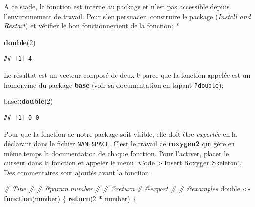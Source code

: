 \documentclass[
  12pt,
  french,
  a4paper,
  extrafontsizes,onecolumn,openright
  ]{memoir}
\newenvironment{Shaded}{\begin{snugshade}}{\end{snugshade}}
\newcommand{\CommentTok}[1]{\textcolor[rgb]{0.56,0.35,0.01}{\textit{#1}}}
\newcommand{\ControlFlowTok}[1]{\textcolor[rgb]{0.13,0.29,0.53}{\textbf{#1}}}
\newcommand{\DecValTok}[1]{\textcolor[rgb]{0.00,0.00,0.81}{#1}}
\newcommand{\FunctionTok}[1]{\textcolor[rgb]{0.13,0.29,0.53}{\textbf{#1}}}
\newcommand{\NormalTok}[1]{#1}
\newcommand{\OtherTok}[1]{\textcolor[rgb]{0.56,0.35,0.01}{#1}}
\newcommand{\SpecialCharTok}[1]{\textcolor[rgb]{0.81,0.36,0.00}{\textbf{#1}}}
\begin{document}
\normalsize

A ce stade, la fonction est interne au package et n'est pas accessible depuis l'environnement de travail.
Pour s'en persuader, construire le package (\emph{Install and Restart}) et vérifier le bon fonctionnement de la fonction:
*

\scriptsize

\begin{Shaded}
\begin{Highlighting}[]
\FunctionTok{double}\NormalTok{(}\DecValTok{2}\NormalTok{)}
\end{Highlighting}
\end{Shaded}

\begin{verbatim}
## [1] 4
\end{verbatim}

\normalsize

Le résultat est un vecteur composé de deux 0 parce que la fonction appelée est un homonyme du package \textbf{base} (voir sa documentation en tapant \texttt{?double}):

\scriptsize

\begin{Shaded}
\begin{Highlighting}[]
\NormalTok{base}\SpecialCharTok{::}\FunctionTok{double}\NormalTok{(}\DecValTok{2}\NormalTok{)}
\end{Highlighting}
\end{Shaded}

\begin{verbatim}
## [1] 0 0
\end{verbatim}

\normalsize

Pour que la fonction de notre package soit visible, elle doit être \emph{exportée} en la déclarant dans le fichier \texttt{NAMESPACE}.
C'est le travail de \textbf{roxygen2} qui gère en même temps la documentation de chaque fonction.
Pour l'activer, placer le curseur dans la fonction et appeler le menu \enquote{Code \textgreater{} Insert Roxygen Skeleton}.
Des commentaires sont ajoutés avant la fonction:

\scriptsize

\begin{Shaded}
\begin{Highlighting}[]
\CommentTok{\#\textquotesingle{} Title}
\CommentTok{\#\textquotesingle{}}
\CommentTok{\#\textquotesingle{} @param number }
\CommentTok{\#\textquotesingle{}}
\CommentTok{\#\textquotesingle{} @return}
\CommentTok{\#\textquotesingle{} @export}
\CommentTok{\#\textquotesingle{}}
\CommentTok{\#\textquotesingle{} @examples}
\NormalTok{double }\OtherTok{\textless{}{-}} \ControlFlowTok{function}\NormalTok{(number) \{}
  \FunctionTok{return}\NormalTok{(}\DecValTok{2} \SpecialCharTok{*}\NormalTok{ number)}
\NormalTok{\}}
\end{Highlighting}
\end{Shaded}
\end{document}

